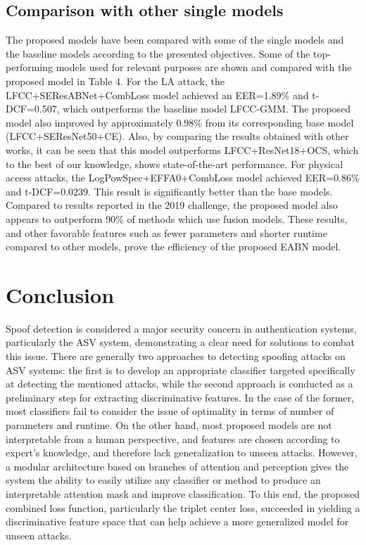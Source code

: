 \documentclass[a4paper]{article}
\begin{document}
\subsection{Comparison with other single models}
The proposed models have been compared with some of the single models and the baseline models according to the presented objectives. Some of the top-performing models used for relevant purposes are shown and compared with the proposed model in Table 4. For the LA attack, the LFCC+SEResABNet+CombLoss model achieved an EER=1.89\% and t-DCF=0.507, which outperforms the baseline model LFCC-GMM. The proposed model also improved by approximately 0.98\% from its corresponding base model (LFCC+SEResNet50+CE). Also, by comparing the results obtained with other works, it can be seen that this model outperforms LFCC+ResNet18+OCS, which to the best of our knowledge, shows state-of-the-art performance.
For physical access attacks, the LogPowSpec+EFFA0+CombLoss model achieved EER=0.86\% and t-DCF=0.0239. This result is significantly better than the base models. Compared to results reported in the 2019 challenge, the proposed model also appears to outperform 90\% of methods which use fusion models. These results, and other favorable features such as fewer parameters and shorter runtime compared to other models, prove the efficiency of the proposed EABN model.
\section{Conclusion}

Spoof detection is considered a major security concern in authentication systems, particularly the ASV system, demonstrating a clear need for solutions to combat this issue. There are generally two approaches to detecting spoofing attacks on ASV systems: the first is to develop an appropriate classifier targeted specifically at detecting the mentioned attacks, while the second approach is conducted as a preliminary step for extracting discriminative features. In the case of the former, most classifiers fail to consider the issue of optimality in terms of number of parameters and runtime. On the other hand, most proposed models are not interpretable from a human perspective, and features are chosen according to expert's knowledge, and therefore lack generalization to unseen attacks. However, a modular architecture based on branches of attention and perception gives the system the ability to easily utilize any classifier or method to produce an interpretable attention mask and improve classification. To this end, the proposed combined loss function, particularly the triplet center loss, succeeded in yielding a discriminative feature space that can help achieve a more generalized model for unseen attacks.
\end{document}

